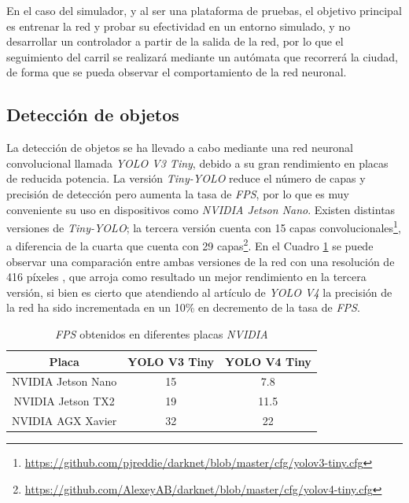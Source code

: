 En el caso del simulador, y al ser una plataforma de pruebas, el objetivo principal es entrenar la red y probar su efectividad en un entorno simulado, y no desarrollar un controlador a partir de la salida de la red, por lo que el seguimiento del carril se realizará mediante un autómata que recorrerá la ciudad, de forma que se pueda observar el comportamiento de la red neuronal.\\

\subsection{Detección de objetos}
\label{subsection:objectdetector}
La detección de objetos se ha llevado a cabo mediante una red neuronal convolucional llamada \textit{YOLO V3 Tiny}, debido a su gran rendimiento en placas de reducida potencia. La versión \textit{Tiny-YOLO} reduce el número de capas y precisión de detección pero aumenta la tasa de \textit{FPS}, por lo que es muy conveniente su uso en dispositivos como \textit{NVIDIA Jetson Nano}. Existen distintas versiones de \textit{Tiny-YOLO}; la tercera versión cuenta con 15 capas convolucionales\footnote{\url{https://github.com/pjreddie/darknet/blob/master/cfg/yolov3-tiny.cfg}}, a diferencia de la cuarta que cuenta con 29 capas\footnote{\url{https://github.com/AlexeyAB/darknet/blob/master/cfg/yolov4-tiny.cfg}}. En el Cuadro \ref{table:v3vsv4} se puede observar una comparación entre ambas versiones de la red con una resolución de 416 píxeles \cite{versus}, que arroja como resultado un mejor rendimiento en la tercera versión, si bien es cierto que atendiendo al artículo de \textit{YOLO V4} \cite{yolov4} la precisión de la red ha sido incrementada en un 10\% en decremento de la tasa de \textit{FPS}.\\

\begin{table}[H]
	\begin{center}
		\begin{tabular}{|c|c|c|}
			\hline
			\textbf{Placa}     & \textbf{YOLO V3 Tiny} & \textbf{YOLO V4 Tiny}
			\\
			\hline
			NVIDIA Jetson Nano & 15                    & 7.8
			\\
			NVIDIA Jetson TX2  & 19                    & 11.5
			\\
			NVIDIA AGX Xavier  & 32                    & 22
			\\
			\hline
		\end{tabular}
		\caption{\textit{FPS} obtenidos en diferentes placas \textit{NVIDIA}}
		\label{table:v3vsv4}
	\end{center}
\end{table}


